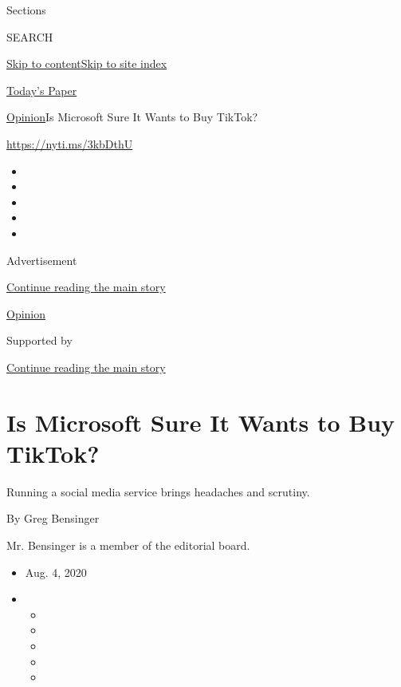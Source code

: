 Sections

SEARCH

\protect\hyperlink{site-content}{Skip to
content}\protect\hyperlink{site-index}{Skip to site index}

\href{https://myaccount.nytimes3xbfgragh.onion/auth/login?response_type=cookie\&client_id=vi}{}

\href{https://www.nytimes3xbfgragh.onion/section/todayspaper}{Today's
Paper}

\href{/section/opinion}{Opinion}\textbar{}Is Microsoft Sure It Wants to
Buy TikTok?

\url{https://nyti.ms/3kbDthU}

\begin{itemize}
\item
\item
\item
\item
\item
\end{itemize}

Advertisement

\protect\hyperlink{after-top}{Continue reading the main story}

\href{/section/opinion}{Opinion}

Supported by

\protect\hyperlink{after-sponsor}{Continue reading the main story}

\hypertarget{is-microsoft-sure-it-wants-to-buy-tiktok}{%
\section{Is Microsoft Sure It Wants to Buy
TikTok?}\label{is-microsoft-sure-it-wants-to-buy-tiktok}}

Running a social media service brings headaches and scrutiny.

By Greg Bensinger

Mr. Bensinger is a member of the editorial board.

\begin{itemize}
\item
  Aug. 4, 2020
\item
  \begin{itemize}
  \item
  \item
  \item
  \item
  \item
  \end{itemize}
\end{itemize}


